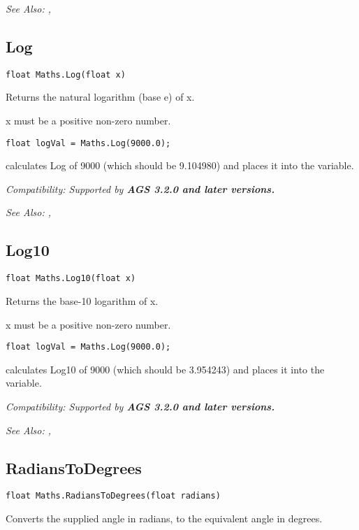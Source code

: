 \it{See Also:} , 


\subsection{Log}\label{Maths.Log}%

\begin{verbatim}
float Maths.Log(float x)
\end{verbatim}
Returns the natural logarithm (base e) of x.

x must be a positive non-zero number.

\begin{verbatim}
float logVal = Maths.Log(9000.0);
\end{verbatim}
calculates Log of 9000 (which should be 9.104980) and places it into the variable.

\it{Compatibility:} Supported by \bf{AGS 3.2.0} and later versions.

\it{See Also:} , 


\subsection{Log10}\label{Maths.Log10}%

\begin{verbatim}
float Maths.Log10(float x)
\end{verbatim}
Returns the base-10 logarithm of x.

x must be a positive non-zero number.

\begin{verbatim}
float logVal = Maths.Log(9000.0);
\end{verbatim}
calculates Log10 of 9000 (which should be 3.954243) and places it into the variable.

\it{Compatibility:} Supported by \bf{AGS 3.2.0} and later versions.

\it{See Also:} , 


\subsection{RadiansToDegrees}\label{Maths.RadiansToDegrees}%

\begin{verbatim}
float Maths.RadiansToDegrees(float radians)
\end{verbatim}
Converts the supplied angle in radians, to the equivalent angle in degrees.

